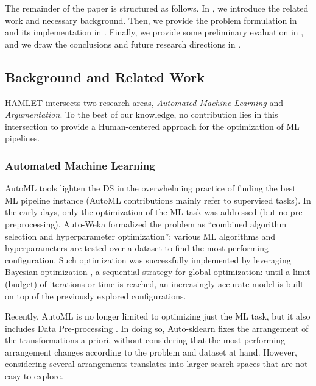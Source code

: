 The remainder of the paper is structured as follows. In , we introduce the related work and necessary background. Then, we provide the problem formulation in  and its implementation in .
Finally, we provide some preliminary evaluation in , and we draw the conclusions and future research directions in .

\subsection{Background and Related Work}\label{ssec:related}
HAMLET intersects two research areas, \emph{Automated Machine Learning} and \emph{Argumentation}. 
To the best of our knowledge, no contribution lies in this intersection to provide a Human-centered approach for the optimization of ML pipelines.

\subsubsection{Automated Machine Learning}
AutoML tools lighten the DS in the overwhelming practice of finding the best ML pipeline instance (AutoML contributions mainly refer to supervised tasks).
In the early days, only the optimization of the ML task was addressed (but no pre-preprocessing).
Auto-Weka \cite{kotthoff2019auto} formalized the problem as ``combined algorithm selection and hyperparameter optimization'': various ML algorithms and hyperparameters are tested over a dataset to find the most performing configuration. Such optimization was successfully implemented by leveraging Bayesian optimization \cite{frazier2018tutorial}, a sequential strategy for global optimization: until a limit (budget) of iterations or time is reached, an increasingly accurate model is built on top of the previously explored configurations.

Recently, AutoML is no longer limited to optimizing just the ML task, but it also includes Data Pre-processing \cite{giovanelli2021effective, quemy2019data}.
In doing so, Auto-sklearn \cite{feurer2019auto} fixes the arrangement of the transformations a priori, without considering that the most performing arrangement changes according to the problem and dataset at hand.
However, considering several arrangements translates into larger search spaces that are not easy to explore.

